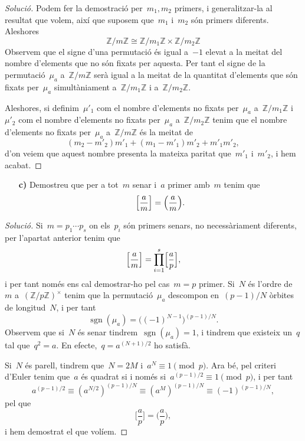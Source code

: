 \documentclass[a4paper]{article}
\newcommand{\ZZ}{\mathbb{Z}}
\DeclareMathOperator{\sgn}{sgn}
\newenvironment{solution}{
    \renewcommand\qedsymbol{\ensuremath{\lozenge}}
    \begin{proof}[Solució]
        }{
    \end{proof}
}
\begin{document}
\begin{solution}
    Podem fer la demostració per~\(m_{1},m_{2}\) primers, i generalitzar-la al
    resultat que volem, així que suposem que~\(m_{1}\) i~\(m_{2}\) són primers
    diferents. Aleshores
    \[
        \ZZ/m\ZZ
        \cong
        \ZZ/m_{1}\ZZ\times\ZZ/m_{2}\ZZ
    \]
    Observem que el signe d'una permutació és igual a~\(-1\) elevat a la meitat
    del nombre d'elements que no són fixats per aquesta. Per tant el signe de la
    permutació~\(\mu_{a}\) a~\(\ZZ/m\ZZ\) serà igual a la meitat de la quantitat
    d'elements que són fixats per~\(\mu_{a}\) simultàniament a~\(\ZZ/m_{1}\ZZ\)
    i a~\(\ZZ/m_{2}\ZZ\).

    Aleshores, si definim~\(\mu'_{1}\) com el nombre d'elements no fixats
    per~\(\mu_{a}\) a~\(\ZZ/m_{1}\ZZ\) i~\(\mu'_{2}\) com el nombre d'elements
    no fixats per~\(\mu_{a}\) a~\(\ZZ/m_{2}\ZZ\) tenim que el nombre d'elements
    no fixats per~\(\mu_{a}\) a~\(\ZZ/m\ZZ\) és la meitat de
    \[
        (m_{2}-m'_{2})m'_{1} + (m_{1}-m'_{1})m'_{2} + m'_{1}m'_{2},
    \]
    d'on veiem que aquest nombre presenta la mateixa paritat que~\(m'_{1}\)
    i~\(m'_{2}\), i hem acabat.
\end{solution}

\begin{enumerate}
    \item[\textbf{c)}] Demostreu que per a tot~\(m\) senar i~\(a\) primer
        amb~\(m\) tenim que
        \[
            \Bigl[\frac{a}{m}\Bigr]
            =
            \Bigl(\frac{a}{m}\Bigr).
        \]
\end{enumerate}

\begin{solution}
    Si~\(m=p_{1}\cdots p_{s}\) on els~\(p_{i}\) són primers senars, no
    necessàriament diferents, per l'apartat anterior tenim que
    \[
        \Bigl[\frac{a}{m}\Bigr]
        =
        \prod_{i=1}^{s}\Bigl[\frac{a}{p}\Bigr],
    \]
    i per tant només ens cal demostrar-ho pel cas~\(m=p\) primer.
    Si~\(N\) és l'ordre de~\(m\) a~\((\ZZ/p\ZZ)^{\times}\) tenim que la
    permutació~\(\mu_{a}\) descompon en~\((p-1)/N\) òrbites de longitud~\(N\), i
    per tant
    \[
        \sgn(\mu_{a}) = \bigl((-1)^{N-1}\bigr)^{(p-1)/N}.
    \]
    Observem que si~\(N\) és senar tindrem~\(\sgn(\mu_{a})=1\), i tindrem que
    existeix un~\(q\) tal que~\(q^{2}=a\). En efecte,~\(q=a^{(N+1)/2}\) ho
    satisfà.

    Si~\(N\) és parell, tindrem que~\(N=2M\) i~\(a^{N}\equiv1\pmod{p}\).
    Ara bé, pel criteri d'Euler tenim que~\(a\) és quadrat si i només
    si~\(a^{(p-1)/2}\equiv1\pmod{p}\), i per tant
    \[
        a^{(p-1)/2}
        \equiv
        (a^{N/2})^{(p-1)/N}
        \equiv
        (a^{M})^{(p-1)/N}
        \equiv
        (-1)^{(p-1)/N},
    \]
    pel que
    \[
        \biggl[\frac{a}{p}\biggr]
        =
        \biggl(\frac{a}{p}\biggr),
    \]
    i hem demostrat el que volíem.
\end{solution}
\end{document}
